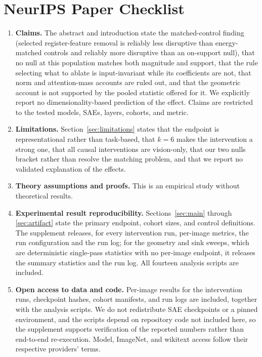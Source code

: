 \documentclass{article}
\begin{document}
\section*{NeurIPS Paper Checklist}
\begin{enumerate}
\item \textbf{Claims.} \answerYes{} The abstract and introduction state the matched-control finding (selected register-feature removal is reliably less disruptive than energy-matched controls and reliably more disruptive than an on-support null), that no null at this population matches both magnitude and support, that the rule selecting what to ablate is input-invariant while its coefficients are not, that norm and attention-mass accounts are ruled out, and that the geometric account is not supported by the pooled statistic offered for it. We explicitly report no dimensionality-based prediction of the effect. Claims are restricted to the tested models, SAEs, layers, cohorts, and metric.
\item \textbf{Limitations.} \answerYes{} Section~\ref{sec:limitations} states that the endpoint is representational rather than task-based, that $k=6$ makes the intervention a strong one, that all causal interventions are vision-only, that our two nulls bracket rather than resolve the matching problem, and that we report no validated explanation of the effects.
\item \textbf{Theory assumptions and proofs.} \answerNA{} This is an empirical study without theoretical results.
\item \textbf{Experimental result reproducibility.} \answerYes{} Sections~\ref{sec:main} through \ref{sec:artifact} state the primary endpoint, cohort sizes, and control definitions. The supplement releases, for every intervention run, per-image metrics, the run configuration and the run log; for the geometry and sink sweeps, which are deterministic single-pass statistics with no per-image endpoint, it releases the summary statistics and the run log. All fourteen analysis scripts are included.
\item \textbf{Open access to data and code.} \answerYes{} Per-image results for the intervention runs, checkpoint hashes, cohort manifests, and run logs are included, together with the analysis scripts. We do not redistribute SAE checkpoints or a pinned environment, and the scripts depend on repository code not included here, so the supplement supports verification of the reported numbers rather than end-to-end re-execution. Model, ImageNet, and wikitext access follow their respective providers' terms.

\end{enumerate}
\end{document}
